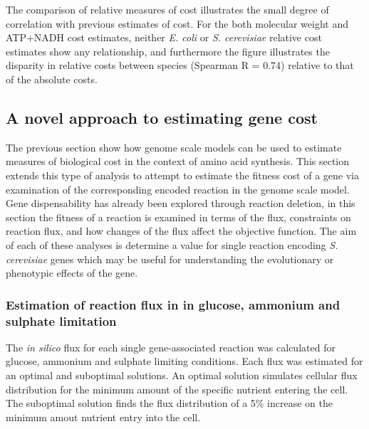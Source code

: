 The comparison of relative measures of cost illustrates the small degree of correlation with previous estimates of cost. For the both molecular weight and ATP+NADH cost estimates, neither \emph{E. coli} or \emph{S. cerevisiae} relative cost estimates show any relationship, and furthermore the figure illustrates the disparity in relative costs between species (Spearman R = 0.74) relative to that of the absolute costs.

\subsection{A novel approach to estimating gene cost}%

The previous section show how genome scale models can be used to estimate measures of biological cost in the context of amino acid synthesis. This section extends this type of analysis to attempt to estimate the fitness cost of a gene via examination of the corresponding encoded reaction in the genome scale model. Gene dispensability has already been explored through reaction deletion, in this section the fitness of a reaction is examined in terms of the flux, constraints on reaction flux, and how changes of the flux affect the objective function. The aim of each of these analyses is determine a value for single reaction encoding \emph{S. cerevisiae} genes which may be useful for understanding the evolutionary or phenotypic effects of the gene.

\subsubsection{Estimation of reaction flux in in glucose, ammonium and sulphate limitation}%

The \emph{in silico} flux for each single gene-associated reaction was calculated for glucose, ammonium and sulphate limiting conditions. Each flux was estimated for an optimal and suboptimal solutions. An optimal solution simulates cellular flux distribution for the minimum amount of the specific nutrient entering the cell. The suboptimal solution finds the flux distribution of a 5\% increase on the minimum amout nutrient entry into the cell.

